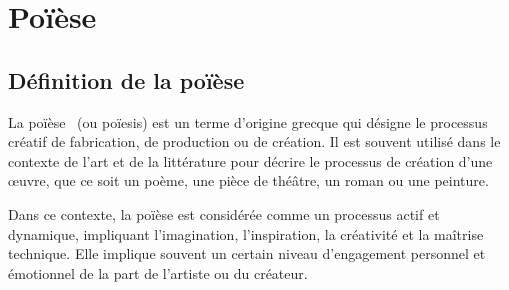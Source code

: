 
\section{Poïèse}

\subsection{Définition de la poïèse}

La poïèse~\cite{wiktionary_poiese_2022} (ou poïesis) est un terme d'origine grecque qui désigne le processus créatif de fabrication, de production ou de création. Il est souvent utilisé dans le contexte de l'art et de la littérature pour décrire le processus de création d'une œuvre, que ce soit un poème, une pièce de théâtre, un roman ou une peinture.

Dans ce contexte, la poïèse est considérée comme un processus actif et dynamique, impliquant l'imagination, l'inspiration, la créativité et la maîtrise technique. Elle implique souvent un certain niveau d'engagement personnel et émotionnel de la part de l'artiste\label{poiese_artise} ou du créateur.

